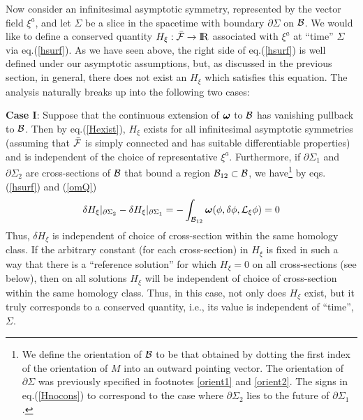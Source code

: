 Now consider an infinitesimal asymptotic symmetry, represented by the
vector field $\xi^a$, and let $\Sigma$ be a slice in the
spacetime with boundary $\partial \Sigma$ on ${\cal B}$. We would like
to define a conserved quantity $H_\xi: \bar{\cal F} \rightarrow {\rm
I} \! {\rm R}$ associated with $\xi^a$ at ``time'' $\Sigma$ via
eq.(\ref{hsurf}). As we have seen above, the right side of
eq.(\ref{hsurf}) is well defined under our asymptotic assumptions,
but, as discussed in the previous section, in general, there does not
exist an $H_\xi$ which satisfies this equation. The analysis naturally
breaks up into the following two cases:

\medskip
\noindent
{\bf Case I}: Suppose that the continuous extension of
${\mbox{\boldmath $\omega$}}$ to ${\cal B}$ has vanishing pullback to
${\cal B}$. Then by eq.(\ref{Hexist}), $H_\xi$ exists for all infinitesimal
asymptotic symmetries (assuming that $\bar{\cal F}$ is simply
connected and has suitable differentiable properties) and is
independent of the choice of representative $\xi^a$. Furthermore, if
$\partial \Sigma_1$ and $\partial \Sigma_2$ are cross-sections of
${\cal B}$ that bound a region ${\cal B}_{12} \subset {\cal B}$, we
have\footnote{We define the orientation of $\cal B$ to be that
obtained by dotting the first index of the orientation of $M$ into an
outward pointing vector. The orientation of $\partial \Sigma$ was
previously specified in footnotes \ref{orient1} and \ref{orient2}. The
signs in eq.(\ref{Hnocons}) to correspond to the case where $\partial
\Sigma_2$ lies to the future of $\partial \Sigma_1$.\label{orient4}}
by eqs.(\ref{hsurf}) and (\ref{omQ})
\begin{equation}
\delta H_\xi|_{\partial \Sigma_2} - \delta H_\xi|_{\partial \Sigma_1} =
- \int_{{\cal B}_{12}} {\mbox{\boldmath $\omega$}}(\phi, \delta \phi,
{\cal L}_\xi \phi) = 0
\label{Hcons}
\end{equation}
Thus, $\delta H_\xi$ is independent of choice of cross-section within
the same homology class. If the arbitrary constant (for each
cross-section) in $H_\xi$ is fixed in such a way that there is a
``reference solution'' for which $H_\xi = 0$ on all cross-sections
(see below), then on all solutions $H_\xi$ will be independent of
choice of cross-section within the same homology class. Thus, in this
case, not only does $H_\xi$ exist, but it truly corresponds to a
conserved quantity, i.e., its value is independent of ``time'',
$\Sigma$.

\medskip

